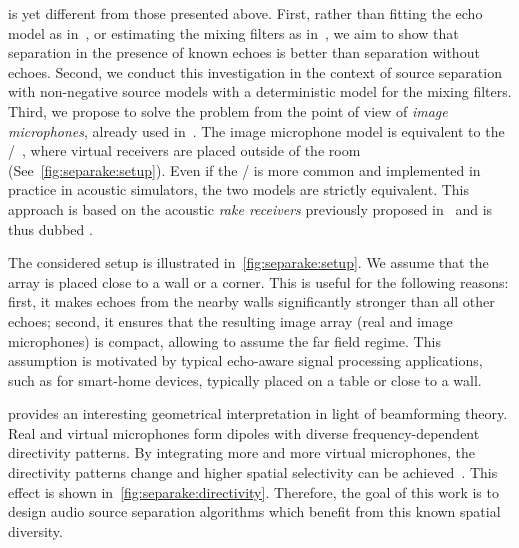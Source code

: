  is yet different from those presented above.
First, rather than fitting the echo model as in~, or estimating the mixing filters as in~,
we aim to show that separation in the presence of known echoes is better than separation without echoes.
Second, we conduct this investigation in the context of source separation with non-negative source models with a deterministic model for the mixing filters.
Third, we propose to solve the problem from the point of view of \textit{image microphones}, already used in~\citeonly{}.
The image microphone model is equivalent to the \ISMdef/~, where virtual receivers are placed outside of the room (See~\cref{fig:separake:setup}).
Even if the \ISM/ is more common and implemented in practice in acoustic simulators, the two models are strictly equivalent.
This approach is based on the acoustic \textit{rake receivers} previously proposed in~ and is thus dubbed .


\mynewline
The considered setup is illustrated in~\cref{fig:separake:setup}.
We assume that the array is placed close to a wall or a corner.
This is useful for the following reasons:
first, it makes echoes from the nearby walls significantly stronger than all other echoes;
second, it ensures that the resulting image array (real and image microphones) is compact, allowing to assume the far field regime.
This assumption is motivated by typical echo-aware signal processing applications, such as for smart-home devices, typically placed on a table or close to a wall.

 provides an interesting geometrical interpretation in light of beamforming theory.
Real and virtual microphones form dipoles with diverse frequency-dependent directivity patterns.
By integrating more and more virtual microphones, the directivity patterns change and higher spatial selectivity can be achieved~.
This effect is shown in~\cref{fig:separake:directivity}.
Therefore, the goal of this work is to design audio source separation algorithms which benefit from this known spatial diversity.

